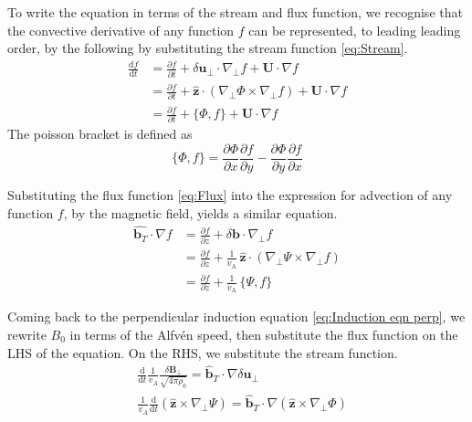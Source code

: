 To write the equation in terms of the stream and flux function, we recognise that the convective derivative of any function \(f\) can be represented, to leading leading order, by the following by substituting the stream function \eqref{eq:Stream}.
\begin{equation}
    \begin{split}
    \frac{\mathrm{d} f}{\mathrm{d}t}
    &= \frac{\partial f}{\partial t}
    + \delta\boldsymbol{u}_{\perp} \cdot \nabla_{\perp} f + \boldsymbol{U}\cdot \nabla f\\
    &= \frac{\partial f}{\partial t}
    + \hat{\boldsymbol{z}} \cdot \left( \nabla_{\perp} \Phi \times \nabla_{\perp} f \right)  + \boldsymbol{U}\cdot \nabla f\\
    &= \frac{\partial f}{\partial t} + \{\Phi, f\} + \boldsymbol{U}\cdot \nabla f
    \label{eq:Convective derivative f}
    \end{split}
\end{equation}
The poisson bracket is defined as
\begin{equation*}
    \{\Phi,f\}= \frac{\partial \Phi}{\partial x}\frac{\partial f}{\partial y}-\frac{\partial \Phi}{\partial y}\frac{\partial f}{\partial x}
\end{equation*}

Substituting the flux function \eqref{eq:Flux} into the expression for advection of any function \(f\), by the magnetic field, yields a similar equation.
\begin{equation}
    \begin{split}
    \hat{\boldsymbol{b}_T} \cdot \nabla f 
    &= \frac{\partial f}{\partial z} + \delta \boldsymbol{b} \cdot \nabla_{\perp} f\\
    &= \frac{\partial f}{\partial z} + \frac{1}{v_{\mathrm{A}}} \, \hat{\boldsymbol{z}} \cdot \left( \nabla_{\perp} \Psi \times \nabla_{\perp} f \right) \\
    &= \frac{\partial f}{\partial z} + \frac{1}{v_{\mathrm{A}}} \, \{\Psi, f\}
    \label{eq:B advection f}
    \end{split}
\end{equation}

Coming back to the perpendicular induction equation \eqref{eq:Induction eqn perp}, we rewrite \(B_0\) in terms of the Alfv\'en speed, then substitute the flux function on the LHS of the equation. On the RHS, we substitute the stream function.
\begin{equation*}
 \begin{split}
      &\frac{\mathrm{d}}{\mathrm{d}t} \frac{1}{v_A}\frac{\delta \boldsymbol{B}_{\perp}}{\sqrt{4 \pi\rho_0}}=  \hat{\boldsymbol{b}}_{T}  \cdot \nabla \delta\boldsymbol{u}_{\perp} \\ 
      &\frac{1}{v_A} \frac{\mathrm{d}}{\mathrm{d}t} (\hat{\boldsymbol{z}} \times \nabla_{\perp} \Psi) =  \hat{\boldsymbol{b}}_{T}  \cdot \nabla (\hat{\boldsymbol{z}} \times \nabla_{\perp} \Phi) \\ 
 \end{split}
\end{equation*}


